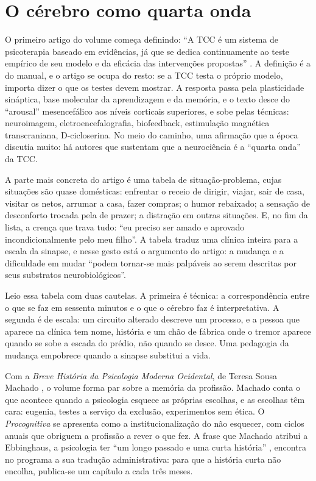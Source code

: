 \documentclass[12pt]{article}
\begin{document}
\section{O cérebro como quarta onda}

O primeiro artigo do volume começa definindo: ``A TCC é um sistema de psicoterapia baseado em evidências, já que se dedica continuamente ao teste empírico de seu modelo e da eficácia das intervenções propostas'' \cite{carvalho-borba}. A definição é a do manual, e o artigo se ocupa do resto: se a TCC testa o próprio modelo, importa dizer o que os testes devem mostrar. A resposta passa pela plasticidade sináptica, base molecular da aprendizagem e da memória, e o texto desce do ``arousal'' mesencefálico aos níveis corticais superiores, e sobe pelas técnicas: neuroimagem, eletroencefalografia, biofeedback, estimulação magnética transcraniana, D-cicloserina. No meio do caminho, uma afirmação que a época discutia muito: há autores que sustentam que a neurociência é a ``quarta onda'' da TCC.

A parte mais concreta do artigo é uma tabela de situação-problema, cujas situações são quase domésticas: enfrentar o receio de dirigir, viajar, sair de casa, visitar os netos, arrumar a casa, fazer compras; o humor rebaixado; a sensação de desconforto trocada pela de prazer; a distração em outras situações. E, no fim da lista, a crença que trava tudo: ``eu preciso ser amado e aprovado incondicionalmente pelo meu filho''. A tabela traduz uma clínica inteira para a escala da sinapse, e nesse gesto está o argumento do artigo: a mudança e a dificuldade em mudar ``podem tornar-se mais palpáveis ao serem descritas por seus substratos neurobiológicos''.

Leio essa tabela com duas cautelas. A primeira é técnica: a correspondência entre o que se faz em sessenta minutos e o que o cérebro faz é interpretativa. A segunda é de escala: um circuito alterado descreve um processo, e a pessoa que aparece na clínica tem nome, história e um chão de fábrica onde o tremor aparece quando se sobe a escada do prédio, não quando se desce. Uma pedagogia da mudança empobrece quando a sinapse substitui a vida.

Com a \emph{Breve História da Psicologia Moderna Ocidental}, de Teresa Sousa Machado \cite{machado}, o volume forma par sobre a memória da profissão. Machado conta o que acontece quando a psicologia esquece as próprias escolhas, e as escolhas têm cara: eugenia, testes a serviço da exclusão, experimentos sem ética. O \emph{Procognitiva} se apresenta como a institucionalização do não esquecer, com ciclos anuais que obriguem a profissão a rever o que fez. A frase que Machado atribui a Ebbinghaus, a psicologia ter ``um longo passado e uma curta história'' \cite[p. 1]{machado}, encontra no programa a sua tradução administrativa: para que a história curta não encolha, publica-se um capítulo a cada três meses.
\end{document}
